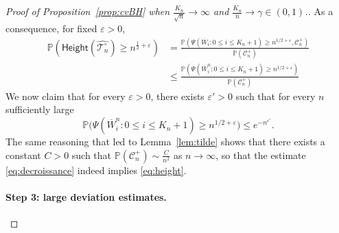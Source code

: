 \documentclass[10pt]{amsart}
\theoremstyle{definition}\newtheorem{defi}[theo]{Definition}\newtheorem{rema}[theo]{Remark}\newtheorem{exam}[theo]{Example}\newtheorem{exem}[theo]{Example}\newtheorem{nota}[theo]{Notation}
\renewcommand{\P}{\mathbb{P}}
\def\eps{\varepsilon}
\def\Ts{\mathscr{T}}
\renewcommand{\epsilon}{\varepsilon}
\renewcommand\Pr[1]{\mathbb{P}\left(#1\right)}
\begin{document}
\begin{proof}[Proof of  Proposition~\ref{prop:cvBH}  when $\tfrac{K_{n}}{\sqrt{n}} \rightarrow \infty$ and $ \tfrac{K_{n}}{n}  \rightarrow \gamma \in (0,1)$.]
As a consequence, for fixed $\epsilon>0$,
\begin{align*}
\Pr{\mathsf{Height}(\hat{\Ts^{\circ}_{n}}) \geq n^{ \tfrac{1}{2} +\epsilon}} &= \frac{\Pr{\Psi( \overline{W}_{i} :0 \leq i \leq K_{n}+1) \geq n^{{1}/{2}+\epsilon},{ \mathcal{C}^{+}_{n} }}}{\Pr{ \mathcal{C}^{+}_{n} }} \\
& \leq  \frac{\Pr{\Psi( \overline{W}^{n}_{i} :0 \leq i \leq K_{n}+1) \geq n^{{1}/{2}+\epsilon}}}{\Pr{ \mathcal{C}^{+}_{n} }}
\end{align*}
 We now claim that for every $\eps>0$, there exists $\epsilon'>0$ such that for every $n$ sufficiently large
\begin{equation}
\label{eq:decroissance} \P\big(\Psi( \overline{W}^{n}_{i} :0 \leq i \leq K_{n}+1) \geq n^{{1}/{2}+\epsilon}
\big) \leq e^{-n^{\epsilon'}}.
\end{equation}
The same reasoning that led to Lemma~\ref{lem:tilde} shows that there exists a constant $C>0$ such that $\Pr{ \mathcal{C}^{+}_{n} } \sim \tfrac{C}{n^{2}}$ as $n \rightarrow \infty$, so that the estimate \eqref{eq:decroissance} indeed implies \eqref{eq:height}.


\paragraph*{Step 3: large deviation estimates.}



\end{proof}
\end{document}
